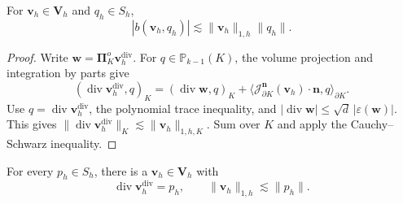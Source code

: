 \documentclass[review,hidelinks,onefignum,onetabnum]{siamart251216}
\newcommand{\AI}[1]{{\color{blue}#1}}
\begin{document}
\begin{lemma}\label{lem:11}
For $\boldsymbol v_h\in\boldsymbol V_h$ and $q_h\in S_h$,
\[
|b(\boldsymbol v_h,q_h)|\lesssim\|\boldsymbol v_h\|_{1,h}\|q_h\|.
\]
\end{lemma}
\AI{\begin{proof}
Write $\boldsymbol w=\boldsymbol\Pi_K^o\boldsymbol v_h^{\operatorname{div}}$.
For $q\in\mathbb P_{k-1}(K)$, the volume projection and integration by parts give
\[
(\operatorname{div}\boldsymbol v_h^{\operatorname{div}},q)_K
=(\operatorname{div}\boldsymbol w,q)_K
+\langle\mathcal J_{\partial K}^{\boldsymbol n}(\boldsymbol v_h)\cdot\boldsymbol n,q\rangle_{\partial K}.
\]
Use $q=\operatorname{div}\boldsymbol v_h^{\operatorname{div}}$, the polynomial
trace inequality, and $|\operatorname{div}\boldsymbol w|\leq
\sqrt d\,|\varepsilon(\boldsymbol w)|$. This gives
$\|\operatorname{div}\boldsymbol v_h^{\operatorname{div}}\|_K
\lesssim\|\boldsymbol v_h\|_{1,h,K}$.
Sum over $K$ and apply the Cauchy--Schwarz inequality.
\end{proof}}

\begin{lemma}\label{lem:12}
For every $p_h\in S_h$, there is a $\boldsymbol v_h\in\boldsymbol V_h$ with
\[
\operatorname{div}\boldsymbol v_h^{\operatorname{div}}=p_h,
\qquad\|\boldsymbol v_h\|_{1,h}\lesssim\|p_h\|.
\]
\end{lemma}
\end{document}
